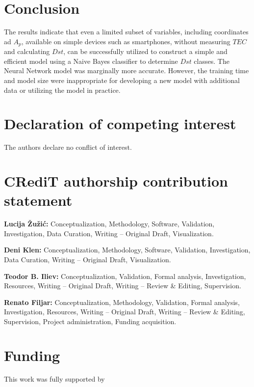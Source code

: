 \documentclass[preprint,12pt]{elsarticle}
\begin{document}
\section{Conclusion}

The results indicate that even a limited subset of variables, including coordinates ad $A_{p}$, available on simple devices such as smartphones, without measuring $TEC$ and calculating $Dst$, can be successfully utilized to construct a simple and efficient model using a Naive Bayes classifier to determine $Dst$ classes. The Neural Network model was marginally more accurate. However, the training time and model size were inappropriate for developing a new model with additional data or utilizing the model in practice.


\section*{Declaration of competing interest}

The authors declare no conflict of interest.

\section*{CRediT authorship contribution statement}

\textbf{Lucija \v{Z}u\v{z}i\'{c}:} Conceptualization, Methodology, Software, Validation, Investigation, Data Curation, Writing -- Original Draft, Visualization. 

\textbf{Deni Klen:} Conceptualization, Methodology, Software, Validation, Investigation, Data Curation, Writing -- Original Draft, Visualization. 

\textbf{Teodor B. Iliev:} Conceptualization,  Validation, Formal analysis, Investigation, Resources, Writing -- Original Draft, Writing -- Review \& Editing, Supervision. 

\textbf{Renato Filjar:} Conceptualization, Methodology, Validation, Formal analysis, Investigation, Resources, Writing -- Original Draft, Writing -- Review \& Editing, Supervision, Project administration, Funding acquisition.


\section*{Funding}

This work was fully supported by



\end{document}
